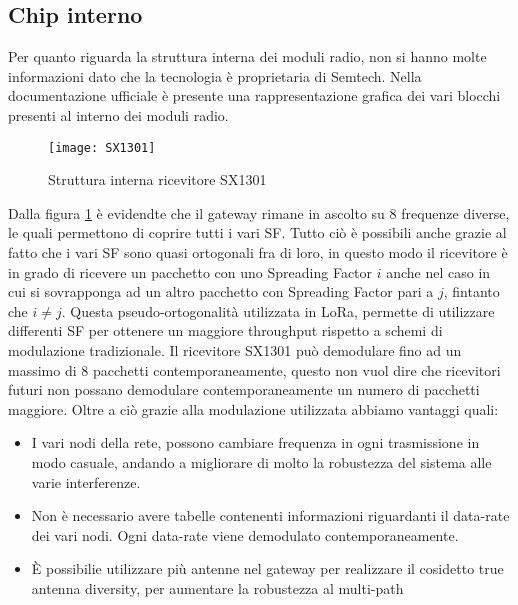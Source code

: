 \subsection{Chip interno}
Per quanto riguarda la struttura interna dei moduli radio, non si hanno molte
informazioni dato che la tecnologia è proprietaria di Semtech. Nella
documentazione ufficiale è presente una rappresentazione grafica dei vari
blocchi presenti al interno dei moduli radio.

\begin{figure}[h]
\centering 
\texttt{[image: SX1301]}
\caption{Struttura interna ricevitore SX1301}
\label{fig:sx1301}
\end{figure}

Dalla figura \ref{fig:sx1301} è evidendte che il gateway rimane in ascolto su 8 
frequenze diverse, le quali permettono di coprire tutti i vari SF. 
Tutto ciò è possibili anche grazie al fatto che i vari SF sono quasi ortogonali 
fra di loro, in questo modo il ricevitore è in grado di ricevere un pacchetto
con uno Spreading Factor $i$ anche nel caso in cui si sovrapponga ad un altro
pacchetto con Spreading Factor pari a $j$, fintanto che $i\neq j$. Questa
pseudo-ortogonalità utilizzata in LoRa, permette di utilizzare differenti SF per
ottenere un maggiore throughput rispetto a schemi di modulazione tradizionale.
Il ricevitore  SX1301 può demodulare fino ad un massimo di 8 pacchetti
contemporaneamente, questo non vuol dire che ricevitori futuri non possano
demodulare contemporaneamente un numero di pacchetti maggiore.
Oltre a ciò grazie alla modulazione utilizzata abbiamo vantaggi quali:
\begin{itemize}
\item I vari nodi della rete, possono cambiare frequenza in ogni trasmissione in
modo casuale, andando a migliorare di molto la robustezza del sistema alle varie
interferenze.
\item Non è necessario avere tabelle contenenti informazioni riguardanti il
data-rate dei vari nodi. Ogni data-rate viene demodulato contemporaneamente.
\item È possibilie utilizzare più antenne nel gateway per realizzare il
cosidetto true antenna diversity, per aumentare la robustezza al multi-path
\end{itemize}

